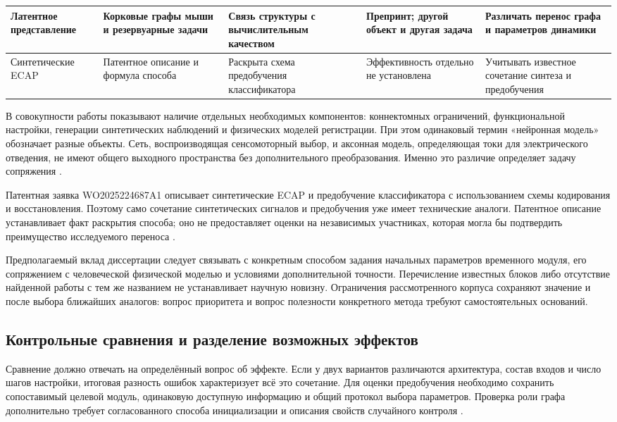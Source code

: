 \begin{longtable}{|T{26mm}|T{33mm}|T{33mm}|T{31mm}|T{29mm}|}
\hline
Латентное представление \cite{s892} & Корковые графы мыши и резервуарные задачи & Связь структуры с вычислительным качеством & Препринт; другой объект и другая задача & Различать перенос графа и параметров динамики \\
\hline
Синтетические ECAP \cite{s746} & Патентное описание и формула способа & Раскрыта схема предобучения классификатора & Эффективность отдельно не установлена & Учитывать известное сочетание синтеза и предобучения \\
\hline
\end{longtable}
\endgroup

В совокупности работы показывают наличие отдельных необходимых компонентов: коннектомных ограничений, функциональной настройки, генерации синтетических наблюдений и физических моделей регистрации. При этом одинаковый термин «нейронная модель» обозначает разные объекты. Сеть, воспроизводящая сенсомоторный выбор, и аксонная модель, определяющая токи для электрического отведения, не имеют общего выходного пространства без дополнительного преобразования. Именно это различие определяет задачу сопряжения \cite{s744,s775,ecapmodel}.

Патентная заявка WO2025224687A1 описывает синтетические ECAP и предобучение классификатора с использованием схемы кодирования и восстановления. Поэтому само сочетание синтетических сигналов и предобучения уже имеет технические аналоги. Патентное описание устанавливает факт раскрытия способа; оно не предоставляет оценки на независимых участниках, которая могла бы подтвердить преимущество исследуемого переноса \cite{s746}.

Предполагаемый вклад диссертации следует связывать с конкретным способом задания начальных параметров временного модуля, его сопряжением с человеческой физической моделью и условиями дополнительной точности. Перечисление известных блоков либо отсутствие найденной работы с тем же названием не устанавливает научную новизну. Ограничения рассмотренного корпуса сохраняют значение и после выбора ближайших аналогов: вопрос приоритета и вопрос полезности конкретного метода требуют самостоятельных оснований.

\subsection{Контрольные сравнения и разделение возможных эффектов}

Сравнение должно отвечать на определённый вопрос об эффекте. Если у двух вариантов различаются архитектура, состав входов и число шагов настройки, итоговая разность ошибок характеризует всё это сочетание. Для оценки предобучения необходимо сохранить сопоставимый целевой модуль, одинаковую доступную информацию и общий протокол выбора параметров. Проверка роли графа дополнительно требует согласованного способа инициализации и описания свойств случайного контроля \cite{s741,s743}.

